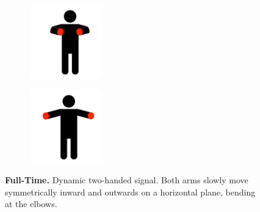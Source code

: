 \begin{figure}[ht!]
    \centering
    \begin{subfigure}{.33\textwidth}
        \centering
        \includegraphics[height=120px]{figs/technical_challenges/full-time-start.png}
    \end{subfigure}
    \begin{subfigure}{.33\textwidth}
        \centering
        \includegraphics[height=120px]{figs/technical_challenges/full-time-end.png}
    \end{subfigure}
    \caption{\textbf{Full-Time.} Dynamic two-handed signal. Both arms slowly move symmetrically inward and outwards on a horizontal plane, bending at the elbows.}
\end{figure}

